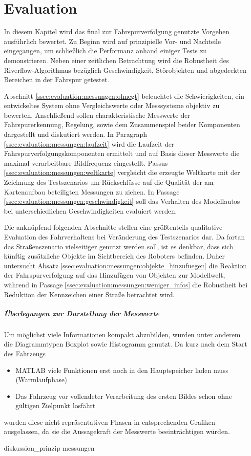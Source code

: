 \chapter{Evaluation \dcfirstauthorshort}
\label{cha:evaluation}

In diesem Kapitel wird das final zur Fahrspurverfolgung genutzte Vorgehen ausführlich bewertet. Zu Beginn wird auf prinzipielle Vor- und Nachteile eingegangen, um schließlich die Performanz anhand einiger Tests zu demonstrieren. Neben einer zeitlichen Betrachtung wird die Robustheit des Riverflow-Algorithmus bezüglich Geschwindigkeit, Störobjekten und abgedeckten Bereichen in der Fahrspur getestet.

Abschnitt \ref{ssec:evaluation:messungen:ohnegt} beleuchtet die Schwierigkeiten, ein entwickeltes System ohne Vergleichswerte oder Messsysteme objektiv zu bewerten. Anschließend sollen charakteristische Messwerte der Fahrspurerkennung, Regelung, sowie dem Zusammenspiel beider Komponenten dargestellt und diskutiert werden. In Paragraph \ref{ssec:evaluation:messungen:laufzeit} wird die Laufzeit der Fahrspurverfolgungskomponenten ermittelt und auf Basis dieser Messwerte die maximal verarbeitbare Bildfrequenz eingestellt. Passus \ref{ssec:evaluation:messungen:weltkarte} vergleicht die erzeugte Weltkarte mit der Zeichnung des Testszenarios um Rückschlüsse auf die Qualität der am Kartenaufbau beteiligten Messungen zu ziehen. In Passage \ref{ssec:evaluation:messungen:geschwindigkeit} soll das Verhalten des Modellautos bei unterschiedlichen Geschwindigkeiten evaluiert werden. 

Die anknüpfend folgenden Abschnitte stellen eine größtenteils qualitative Evaluation des Fahrverhaltens bei Veränderung des Testszenarios dar. Da fortan das Straßenszenario vielseitiger genutzt werden soll, ist es denkbar, dass sich künftig zusätzliche Objekte im Sichtbereich des Roboters befinden. Daher untersucht Absatz \ref{ssec:evaluation:messungen:objekte_hinzufuegen} die Reaktion der Fahrspurverfolgung auf das Hinzufügen von Objekten zur Modellwelt, während in Passage \ref{ssec:evaluation:messungen:weniger_infos} die Robustheit bei Reduktion der Kennzeichen einer Straße betrachtet wird.

\paragraph{Überlegungen zur Darstellung der Messwerte  \dcsecondauthorshort}
Um möglichst viele Informationen kompakt abzubilden, wurden unter anderem die Diagrammtypen Boxplot sowie Histogramm genutzt. Da kurz nach dem Start des Fahrzeugs 
\begin{itemize}
	\item
	MATLAB viele Funktionen erst noch in den Hauptspeicher laden muss (\glqq Warmlaufphase\grqq)
	\item
	Das Fahrzeug vor vollendeter Verarbeitung des ersten Bildes schon ohne gültigen Zielpunkt losfährt
\end{itemize}
wurden diese nicht-repräsentativen Phasen in entsprechenden Grafiken ausgelassen, da sie die Aussagekraft der Messwerte beeinträchtigen würden. 

{diskussion_prinzip}
{messungen}

